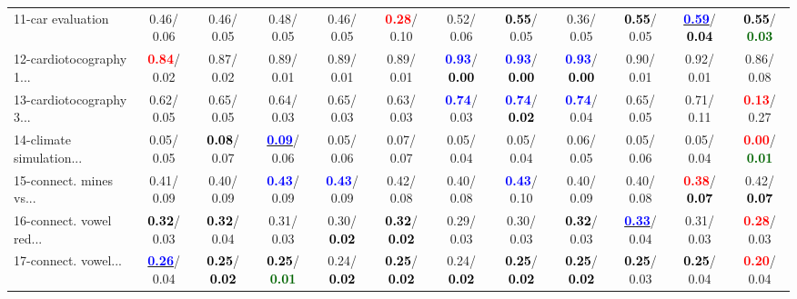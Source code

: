 \begin{table}[h]
\begin{center}
{\begin{tabular}{lc|c|c|c|c|c|c|c|c|c|c}
11-car evaluation &   0.46/  0.06 &   0.46/  0.05 &   0.48/  0.05 &   0.46/  0.05 & \textcolor{red}{\textbf{  0.28}}/  0.10 &   0.52/  0.06 & \textcolor{black}{\textbf{  0.55}}/  0.05 &   0.36/  0.05 & \textcolor{black}{\textbf{  0.55}}/  0.05 & \underline{\textcolor{blue}{\textbf{  0.59}}}/\textcolor{black}{\textbf{  0.04}} & \textcolor{black}{\textbf{  0.55}}/\textcolor{darkgreen}{\textbf{  0.03}} \\
12-cardiotocography 1... & \textcolor{red}{\textbf{  0.84}}/  0.02 &   0.87/  0.02 &   0.89/  0.01 &   0.89/  0.01 &   0.89/  0.01 & \textcolor{blue}{\textbf{  0.93}}/\textcolor{black}{\textbf{  0.00}} & \textcolor{blue}{\textbf{  0.93}}/\textcolor{black}{\textbf{  0.00}} & \textcolor{blue}{\textbf{  0.93}}/\textcolor{black}{\textbf{  0.00}} &   0.90/  0.01 &   0.92/  0.01 &   0.86/  0.08 \\
13-cardiotocography 3... &   0.62/  0.05 &   0.65/  0.05 &   0.64/  0.03 &   0.65/  0.03 &   0.63/  0.03 & \textcolor{blue}{\textbf{  0.74}}/  0.03 & \textcolor{blue}{\textbf{  0.74}}/\textcolor{black}{\textbf{  0.02}} & \textcolor{blue}{\textbf{  0.74}}/  0.04 &   0.65/  0.05 &   0.71/  0.11 & \textcolor{red}{\textbf{  0.13}}/  0.27 \\
14-climate simulation... &   0.05/  0.05 & \textcolor{black}{\textbf{  0.08}}/  0.07 & \underline{\textcolor{blue}{\textbf{  0.09}}}/  0.06 &   0.05/  0.06 &   0.07/  0.07 &   0.05/  0.04 &   0.05/  0.04 &   0.06/  0.05 &   0.05/  0.06 &   0.05/  0.04 & \textcolor{red}{\textbf{  0.00}}/\textcolor{darkgreen}{\textbf{  0.01}} \\ \hline
15-connect. mines vs... &   0.41/  0.09 &   0.40/  0.09 & \textcolor{blue}{\textbf{  0.43}}/  0.09 & \textcolor{blue}{\textbf{  0.43}}/  0.09 &   0.42/  0.08 &   0.40/  0.08 & \textcolor{blue}{\textbf{  0.43}}/  0.10 &   0.40/  0.09 &   0.40/  0.08 & \textcolor{red}{\textbf{  0.38}}/\textcolor{black}{\textbf{  0.07}} &   0.42/\textcolor{black}{\textbf{  0.07}} \\
16-connect. vowel red... & \textcolor{black}{\textbf{  0.32}}/  0.03 & \textcolor{black}{\textbf{  0.32}}/  0.04 &   0.31/  0.03 &   0.30/\textcolor{black}{\textbf{  0.02}} & \textcolor{black}{\textbf{  0.32}}/\textcolor{black}{\textbf{  0.02}} &   0.29/  0.03 &   0.30/  0.03 & \textcolor{black}{\textbf{  0.32}}/  0.03 & \underline{\textcolor{blue}{\textbf{  0.33}}}/  0.04 &   0.31/  0.03 & \textcolor{red}{\textbf{  0.28}}/  0.03 \\
17-connect. vowel... & \underline{\textcolor{blue}{\textbf{  0.26}}}/  0.04 & \textcolor{black}{\textbf{  0.25}}/\textcolor{black}{\textbf{  0.02}} & \textcolor{black}{\textbf{  0.25}}/\textcolor{darkgreen}{\textbf{  0.01}} &   0.24/\textcolor{black}{\textbf{  0.02}} & \textcolor{black}{\textbf{  0.25}}/\textcolor{black}{\textbf{  0.02}} &   0.24/\textcolor{black}{\textbf{  0.02}} & \textcolor{black}{\textbf{  0.25}}/\textcolor{black}{\textbf{  0.02}} & \textcolor{black}{\textbf{  0.25}}/\textcolor{black}{\textbf{  0.02}} & \textcolor{black}{\textbf{  0.25}}/  0.03 & \textcolor{black}{\textbf{  0.25}}/  0.04 & \textcolor{red}{\textbf{  0.20}}/  0.04 \\

\end{tabular}}
\end{center}
\end{table}
